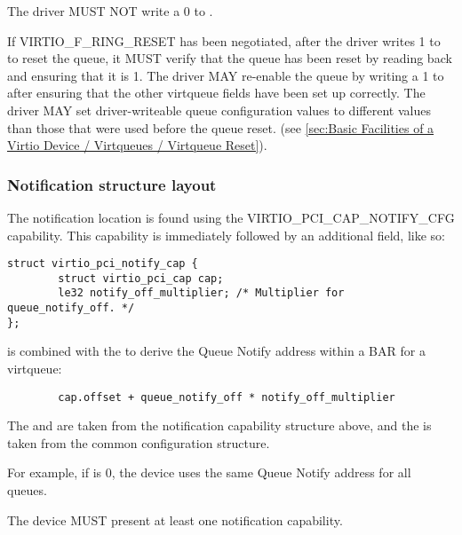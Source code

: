 The driver MUST NOT write a 0 to .

If VIRTIO_F_RING_RESET has been negotiated, after the driver writes 1 to
 to reset the queue, it MUST verify that the queue
has been reset by reading back  and ensuring that it
is 1. The driver MAY re-enable the queue by writing a 1 to
 after ensuring that the other virtqueue fields have
been set up correctly. The driver MAY set driver-writeable queue configuration
values to different values than those that were used before the queue reset.
(see \ref{sec:Basic Facilities of a Virtio Device / Virtqueues / Virtqueue Reset}).

\subsubsection{Notification structure layout}\label{sec:Virtio Transport Options / Virtio Over PCI Bus / PCI Device Layout / Notification capability}

The notification location is found using the VIRTIO_PCI_CAP_NOTIFY_CFG
capability.  This capability is immediately followed by an additional
field, like so:

\begin{lstlisting}
struct virtio_pci_notify_cap {
        struct virtio_pci_cap cap;
        le32 notify_off_multiplier; /* Multiplier for queue_notify_off. */
};
\end{lstlisting}

 is combined with the  to
derive the Queue Notify address within a BAR for a virtqueue:

\begin{lstlisting}
        cap.offset + queue_notify_off * notify_off_multiplier
\end{lstlisting}

The  and  are taken from the
notification capability structure above, and the  is
taken from the common configuration structure.

\begin{note}
For example, if  is 0, the device uses
the same Queue Notify address for all queues.
\end{note}

The device MUST present at least one notification capability.


